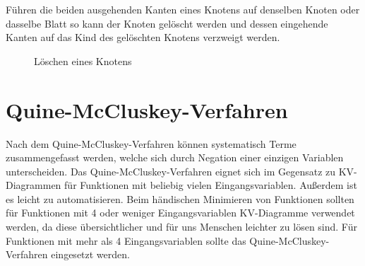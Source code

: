Führen die beiden ausgehenden Kanten eines Knotens auf denselben Knoten oder dasselbe Blatt so kann der Knoten gelöscht werden und dessen eingehende Kanten auf das Kind des gelöschten Knotens verzweigt werden. 
\begin{figure}[hp]
\centering
{}
\caption{Löschen eines Knotens}
\end{figure}

\section{Quine-McCluskey-Verfahren}
Nach dem Quine-McCluskey-Verfahren können systematisch Terme zusammengefasst werden, welche sich durch Negation einer einzigen Variablen unterscheiden. Das Quine-McCluskey-Verfahren eignet sich im Gegensatz zu KV-Diagrammen für Funktionen mit beliebig vielen Eingangsvariablen. Außerdem ist es leicht zu automatisieren. Beim händischen Minimieren von Funktionen sollten für Funktionen mit 4 oder weniger Eingangsvariablen KV-Diagramme verwendet werden, da diese übersichtlicher und für uns Menschen leichter zu lösen sind. Für Funktionen mit mehr als 4 Eingangsvariablen sollte das Quine-McCluskey-Verfahren eingesetzt werden.

